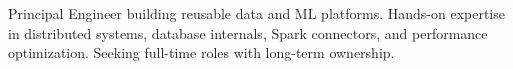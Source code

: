 \begin{cvparagraph}
Principal Engineer building reusable data and ML platforms. Hands-on expertise in distributed systems, database internals, Spark connectors, and performance optimization. Seeking full-time roles with long-term ownership.
\end{cvparagraph}
